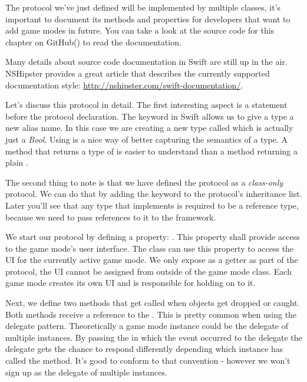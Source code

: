 The protocol we've just defined will be implemented by
multiple classes, it's important to document its methods and properties for developers that want
to add game modes in future. You can take a look at the source code for
this chapter on GitHub() to read the documentation. %

\begin{details} Many details about source code documentation in Swift are still up in the air.
NSHipster provides a great article that describes the currently supported
documentation style: \url{http://nshipster.com/swift-documentation/}.
\end{details}

Let's discuss this protocol in detail. The first interesting aspect is a
 statement before the protocol declaration. The
 keyword in Swift allows us to give a type a new alias
name. In this case we are creating a new type called  which
is actually just a \textit{Bool}. Using  is a nice way
of better capturing the semantics of a type. A method that returns a
type of  is easier to understand than a method returning a
plain .

The second thing to note is that we
have defined the protocol as a \textit{class-only} protocol. We can do that by
adding the  keyword to the protocol's inheritance list. Later
you'll see that any type that implements  is
required to be a reference type, because we need to pass references to it to the
\cocos{} framework. 

We start our protocol by defining a property: . This
property shall provide access to the game mode's user interface. The
 class can use this property to access the UI for the
currently active game mode.
We only expose as a getter as part of the protocol, the UI cannot be assigned
from outside of the game mode class. Each game mode creates its own UI and is
responsible for holding on to it.

Next, we define two methods that get called when objects get dropped or caught.
Both methods receive a reference to the . This is pretty
common when using the delegate pattern. Theoretically a game mode instance
could be the delegate of multiple  instances. By passing
the  in which the event occurred to the delegate the
delegate gets the chance to respond differently depending which instance has
called the method. It's good to conform to that convention - however we won't
sign up as the delegate of multiple  instances.


